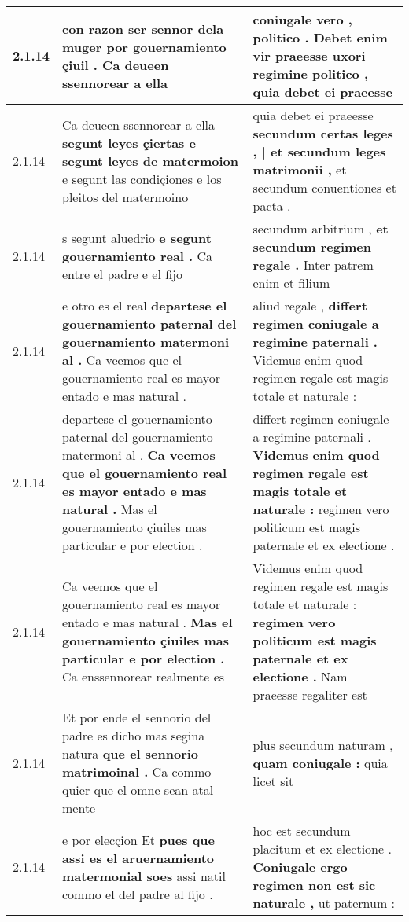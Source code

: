 \begin{tabular}{|p{1cm}|p{6.5cm}|p{6.5cm}|}
2.1.14 & con razon ser sennor dela muger \textbf{ por gouernamiento çiuil . } Ca deueen ssennorear a ella & coniugale vero , politico . \textbf{ Debet enim vir praeesse uxori regimine politico , } quia debet ei praeesse \\\hline
2.1.14 & Ca deueen ssennorear a ella \textbf{ segunt leyes çiertas e segunt leyes de matermoion } e segunt las condiçiones e los pleitos del matermoino & quia debet ei praeesse \textbf{ secundum certas leges , | et secundum leges matrimonii , } et secundum conuentiones et pacta . \\\hline
2.1.14 & s segunt aluedrio \textbf{ e segunt gouernamiento real . } Ca entre el padre e el fijo & secundum arbitrium , \textbf{ et secundum regimen regale . } Inter patrem enim et filium \\\hline
2.1.14 & e otro es el real \textbf{ departese el gouernamiento paternal del gouernamiento matermoni al . } Ca veemos que el gouernamiento real es mayor entado e mas natural . & aliud regale , \textbf{ differt regimen coniugale a regimine paternali . } Videmus enim quod regimen regale est magis totale et naturale : \\\hline
2.1.14 & departese el gouernamiento paternal del gouernamiento matermoni al . \textbf{ Ca veemos que el gouernamiento real es mayor entado e mas natural . } Mas el gouernamiento çiuiles mas particular e por election . & differt regimen coniugale a regimine paternali . \textbf{ Videmus enim quod regimen regale est magis totale et naturale : } regimen vero politicum est magis paternale et ex electione . \\\hline
2.1.14 & Ca veemos que el gouernamiento real es mayor entado e mas natural . \textbf{ Mas el gouernamiento çiuiles mas particular e por election . } Ca enssennorear realmente es & Videmus enim quod regimen regale est magis totale et naturale : \textbf{ regimen vero politicum est magis paternale et ex electione . } Nam praeesse regaliter est \\\hline
2.1.14 & Et por ende el sennorio del padre es dicho mas segina natura \textbf{ que el sennorio matrimoinal . } Ca commo quier que el omne sean atal mente & plus secundum naturam , \textbf{ quam coniugale : } quia licet sit \\\hline
2.1.14 & e por elecçion Et \textbf{ pues que assi es el aruernamiento matermonial soes } assi natil commo el del padre al fijo . & hoc est secundum placitum et ex electione . \textbf{ Coniugale ergo regimen non est sic naturale , } ut paternum : \\\hline

\end{tabular}
